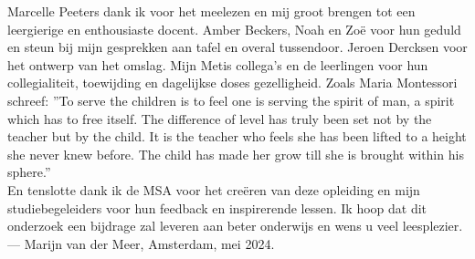 \documentclass[12pt, a4paper]{article}
\begin{document}
Marcelle Peeters dank ik voor het meelezen en mij groot brengen tot een leergierige en enthousiaste docent. Amber Beckers, Noah en Zoë voor hun geduld en steun bij mijn gesprekken aan tafel en overal tussendoor. Jeroen Dercksen voor het ontwerp van het omslag. Mijn Metis collega's en de leerlingen voor hun collegialiteit, toewijding en dagelijkse doses gezelligheid. Zoals Maria Montessori schreef: ''To serve the children is to feel one is serving the spirit of man, a spirit which has to free itself. The difference of level has truly been set not by the teacher but by the child. It is the teacher who feels she has been lifted to a height she never knew before. The child has made her grow till she is brought within his sphere.'' \cite[p.257]{Montessori2016}\\

En tenslotte dank ik de MSA voor het creëren van deze opleiding en mijn studiebegeleiders voor hun feedback en inspirerende lessen.
Ik hoop dat dit onderzoek een bijdrage zal leveren aan beter onderwijs en wens u veel leesplezier.\\

--- \textup{Marijn van der Meer, Amsterdam, mei 2024.}
\end{document}
